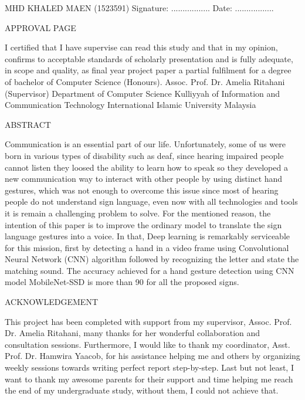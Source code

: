 \documentclass[12pt]{report}
\begin{document}
\mbox{}
\vfill
MHD KHALED MAEN (1523591)
\bigbreak
Signature: .................\hspace{18em} Date: .................
\bigbreak

\newpage
\begin{center}
    \LARGE APPROVAL PAGE
\end{center} 

I certified that I have supervise can read this study and that in my opinion,
confirms to acceptable standards of scholarly presentation and is fully adequate,
in scope and quality, as final year project paper a partial fulfilment for a 
degree of bachelor of Computer Science (Honours).
\mbox{}
\vfill
Assoc. Prof. Dr. Amelia Ritahani (Supervisor)
\bigbreak
Department of Computer Science
\bigbreak
Kulliyyah of Information and Communication Technology
\bigbreak
International Islamic University Malaysia
\bigbreak

\newpage

\begin{center}
    \LARGE ABSTRACT
\end{center}

    Communication is an essential part of our life. 
    Unfortunately, some of us were born in various types 
    of disability such as deaf, since hearing impaired people 
    cannot listen they loosed the ability to learn how to speak so 
    they developed a new communication way to interact with other people 
    by using distinct hand gestures, which was not enough  to overcome this 
    issue since most of hearing people do not understand sign language, even 
    now with all technologies and tools it is remain a challenging problem to solve. 
    For the mentioned reason, the intention of this paper is to improve the ordinary model 
    to translate the sign language gestures into a voice. In that, Deep learning is remarkably 
    serviceable for this mission, first by detecting a hand in a video frame using Convolutional 
    Neural Network (CNN) algorithm followed by recognizing the letter and state the matching sound. 
    The accuracy achieved for a hand gesture detection using CNN model MobileNet-SSD is more than 90 \text{\%} for all the proposed signs.


\newpage
\begin{center}
    \LARGE ACKNOWLEDGEMENT
\end{center} 

This project has been completed with support from my supervisor, Assoc. Prof. Dr. Amelia Ritahani, many thanks for her wonderful 
collaboration and consultation sessions. Furthermore, 
I would like to thank my coordinator, Asst. Prof. Dr. Hamwira Yaacob, for his 
assistance helping me and others by organizing weekly sessions towards writing perfect report step-by-step. 
Last but not least,
I want to thank my awesome parents for their support and time helping me reach the end of my undergraduate study, without them, I could not achieve that.
\end{document}
